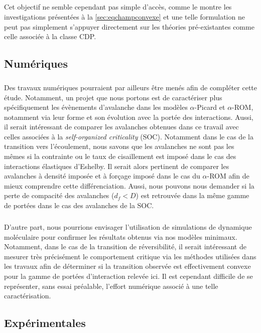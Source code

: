 \subparagraph{}Cet objectif ne semble cependant pas simple d'accès, comme le montre les investigations présentées à la \autoref{sec:eqchampconvexe} et une telle formulation ne peut pas simplement s'appuyer directement sur les théories pré-existantes comme celle associée à la classe CDP.

\subsection*{Numériques}

\subparagraph{}Des travaux numériques pourraient par ailleurs être menés afin de compléter cette étude. Notamment, un projet que nous portons est de caractériser plus spécifiquement les évènements d'avalanche dans les modèles $\alpha$-Picard et $\alpha$-ROM, notamment via leur forme \cite{wiese_theory_2022} et son évolution avec la portée des interactions. Aussi, il serait intéressant de comparer les avalanches obtenues dans ce travail avec celles associées à la \textit{self-organized criticality} (SOC). Notamment dans le cas de la transition vers l'écoulement, nous savons que les avalanches ne sont pas les mêmes si la contrainte ou le taux de cisaillement est imposé dans le cas des interactions élastiques d'Eshelby. Il serait alors pertinent de comparer les avalanches à densité imposée et à forçage imposé dans le cas du $\alpha$-ROM afin de mieux comprendre cette différenciation. Aussi, nous pouvons nous demander si la perte de compacité des avalanches ($d_f < D$) est retrouvée dans la même gamme de portées dans le cas des avalanches de la SOC.

\subparagraph{}D'autre part, nous pourrions envisager l'utilisation de simulations de dynamique moléculaire pour confirmer les résultats obtenus via nos modèles minimaux. Notamment, dans le cas de la transition de réversibilité, il serait intéressant de mesurer très précisément le comportement critique via les méthodes utilisées dans les travaux \cite{metzger_irreversibility_2010, ge_rheology_2022} afin de déterminer si la transition observée est effectivement convexe pour la gamme de portées d'interaction relevée ici. Il est cependant difficile de se représenter, sans essai préalable, l'effort numérique associé à une telle caractérisation.

\subsection*{Expérimentales}


